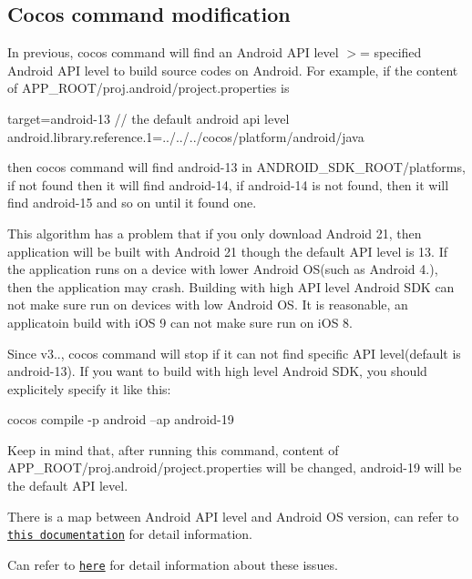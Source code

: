 \subsection*{Cocos command modification}

In previous, cocos command will find an Android A\+PI level $>$= specified Android A\+PI level to build source codes on Android. For example, if the content of {\ttfamily A\+P\+P\+\_\+\+R\+O\+O\+T/proj.\+android/project.properties} is


\begin{DoxyCode}
target=android-13 // the default android api level
android.library.reference.1=../../../cocos/platform/android/java
\end{DoxyCode}
 then cocos command will find {\ttfamily android-\/13} in {\ttfamily A\+N\+D\+R\+O\+I\+D\+\_\+\+S\+D\+K\+\_\+\+R\+O\+O\+T/platforms}, if not found then it will find {\ttfamily android-\/14}, if {\ttfamily android-\/14} is not found, then it will find {\ttfamily android-\/15} and so on until it found one.

This algorithm has a problem that if you only download Android 21, then application will be built with Android 21 though the default A\+PI level is 13. If the application runs on a device with lower Android OS(such as Android 4.), then the application may crash. Building with high A\+PI level Android S\+DK can not make sure run on devices with low Android OS. It is reasonable, an applicatoin build with i\+OS 9 can not make sure run on i\+OS 8.

Since v3.., cocos command will stop if it can not find specific A\+PI level(default is android-\/13). If you want to build with high level Android S\+DK, you should explicitely specify it like this\+:


\begin{DoxyCode}
cocos compile -p android --ap android-19
\end{DoxyCode}


Keep in mind that, after running this command, content of {\ttfamily A\+P\+P\+\_\+\+R\+O\+O\+T/proj.\+android/project.properties} will be changed, {\ttfamily android-\/19} will be the default A\+PI level.

There is a map between Android A\+PI level and Android OS version, can refer to \href{https://developer.android.com/guide/topics/manifest/uses-sdk-element.html}{\tt this documentation} for detail information.

Can refer to \href{https://github.com/cocos2d/cocos2d-x/milestone/33}{\tt here} for detail information about these issues. 